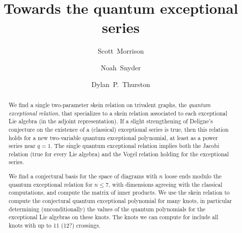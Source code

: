\documentclass[12pt]{amsart}
\begin{document}
\title{Towards the quantum exceptional series}

\author[Morrison]{Scott~Morrison}
\address{Mathematical Sciences Institute, Australian National University}

\author[Snyder]{Noah~Snyder}
\address{Bloomington, Indiana, USA}

\author[Thurston]{Dylan~P.~Thurston}
\address{Bloomington, Indiana, USA}

\begin{abstract}
  We find a single two-parameter skein relation on trivalent graphs,
  the \emph{quantum exceptional relation}, that specializes to a skein
  relation associated to each exceptional Lie algebra (in the adjoint
  representation). If a slight
  strengthening of Deligne's conjecture on the existence of a
  (classical) exceptional series is true, then this relation
  holds for a new two-variable quantum exceptional polynomial, at
  least as a power series near $q=1$. The
  single quantum exceptional relation implies both the
  Jacobi relation (true for every Lie algebra) and
  the Vogel relation holding for the exceptional series.

  We find a conjectural basis for the space of diagrams with $n$ loose
  ends modulo the quantum exceptional relation for $n \le 7$, with
  dimensions agreeing with the classical computations, and compute
  the matrix of inner products. 
  We use the
  skein relation to compute the conjectural quantum exceptional
  polynomial for many knots, in particular
  determining (unconditionally) the values of the quantum polynomials
  for the exceptional Lie algebras on
  these knots. The knots we can compute for include all knots with up
  to 11 (12?) crossings.
\end{abstract}


\maketitle

\tableofcontents
\end{document}
